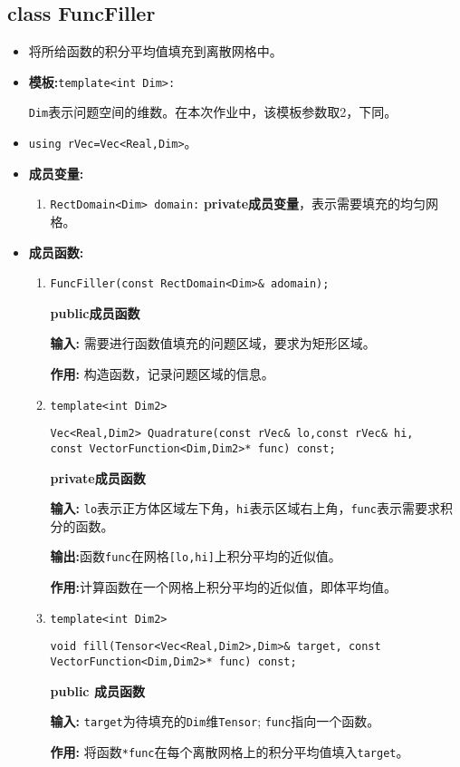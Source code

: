 \documentclass[UTF8]{ctexart}
\theoremstyle{plain}
\theoremstyle{definition}
\theoremstyle{remark}
\begin{document}
\subsection{class FuncFiller}
\begin{itemize}
    \item 将所给函数的积分平均值填充到离散网格中。
    \item \textbf{模板:}\texttt{template<int Dim>:}
    
    \texttt{Dim}表示问题空间的维数。在本次作业中，该模板参数取2，下同。

    \item \texttt{using rVec=Vec<Real,Dim>}。
    \item \textbf{成员变量:}
    \begin{enumerate}
        \item \texttt{RectDomain<Dim> domain:} \textbf{private成员变量}，表示需要填充的均匀网格。
    \end{enumerate}

    \item \textbf{成员函数:}
    \begin{enumerate}
        \item \texttt{FuncFiller(const RectDomain<Dim>\& adomain);}
        
        \textbf{public成员函数}
        
        \textbf{输入:} 需要进行函数值填充的问题区域，要求为矩形区域。

        \textbf{作用:} 构造函数，记录问题区域的信息。
        \item \texttt{template<int Dim2>}
        
        \texttt{Vec<Real,Dim2> Quadrature(const rVec\& lo,const rVec\& hi,\\const VectorFunction<Dim,Dim2>* func) const;}
        
        \textbf{private成员函数}
        
        \textbf{输入:} \texttt{lo}表示正方体区域左下角，\texttt{hi}表示区域右上角，\texttt{func}表示需要求积分的函数。

        \textbf{输出:}函数\texttt{func}在网格\texttt{[lo,hi]}上积分平均的近似值。

        \textbf{作用:}计算函数在一个网格上积分平均的近似值，即体平均值。


        \item 
        \texttt{template<int Dim2>}

        \texttt{void fill(Tensor<Vec<Real,Dim2>,Dim>\& target, const VectorFunction<Dim,Dim2>* func) const;} 
        
        \textbf{public 成员函数}

        \textbf{输入:} \texttt{target}为待填充的\texttt{Dim}维\texttt{Tensor}; \texttt{func}指向一个函数。

        \textbf{作用:} 将函数\texttt{*func}在每个离散网格上的积分平均值填入\texttt{target}。

    \end{enumerate}
\end{itemize}
\end{document}
